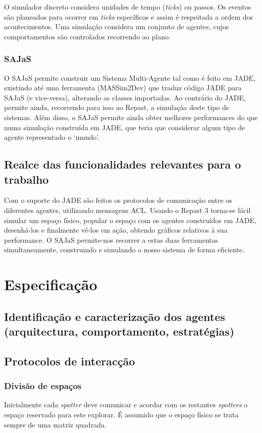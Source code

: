 \documentclass[12pt]{report}
\begin{document}
  O simulador discreto considera unidades de tempo (\emph{ticks}) ou passos. Os eventos são planeados para ocorrer em \emph{ticks} específicos e assim é respeitada a ordem dos acontecimentos. Uma simulação considera um conjunto de agentes, cujos comportamentos são controlados recorrendo ao plano.

  \subsection{SAJaS}
  O SAJaS permite construir um Sistema Multi-Agente tal como é feito em JADE, existindo até uma ferramenta (MASSim2Dev) que traduz código JADE para SAJaS (e vice-versa), alterando as classes importadas. Ao contrário do JADE, permite ainda, recorrendo para isso ao Repast, a simulação deste tipo de sistemas. Além disso, o SAJaS permite ainda obter melhores performances do que numa simulação construída em JADE, que teria que considerar algum tipo de agente representado o `mundo'.

\section{Realce das funcionalidades relevantes para o trabalho}

Com o suporte do JADE são feitos os protocolos de comunicação entre os diferentes agentes, utilizando mensagens ACL. Usando o Repast 3 torna-se
fácil simular um espaço físico, popular o espaço com os agentes construídos em JADE, desenhá-los e finalmente vê-los em ação, obtendo gráficos relativos à sua performance. O SAJaS permite-nos recorrer a estas duas ferramentas simultaneamente, construindo e simulando o nosso sistema de forma eficiente.

\chapter{Especificação}
\section{Identificação e caracterização dos agentes (arquitectura, comportamento, estratégias)}

\section{Protocolos de interacção}

\subsection{Divisão de espaços}
Inicialmente cada \emph{spotter} deve comunicar e acordar com os restantes \emph{spotters} o espaço reservado para este explorar.
É assumido que o espaço físico se trata sempre de uma matriz quadrada.
\end{document}
